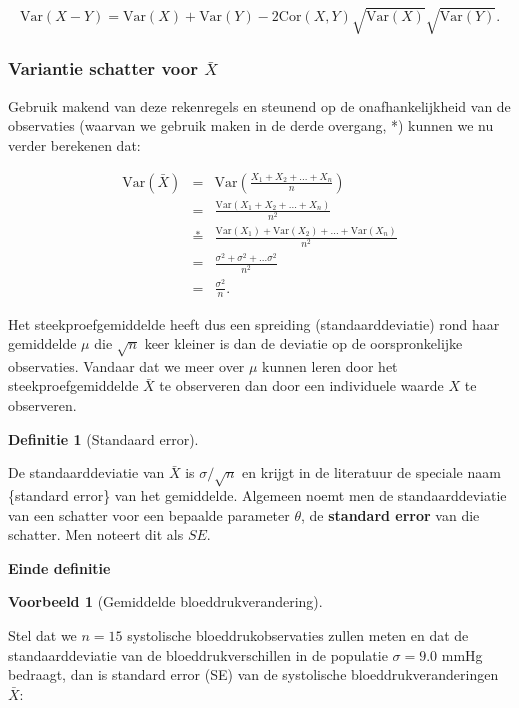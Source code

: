 \documentclass[
  12pt,dutch,coursenotes]{book}
\theoremstyle{definition}
\newtheorem{definition}{Definitie}[chapter]
\theoremstyle{definition}
\newtheorem{example}{Voorbeeld}[chapter]
\theoremstyle{definition}
\theoremstyle{remark}
\begin{document}
\begin{equation*}
\text{Var}(X-Y) = \text{Var}(X) + \text{Var}(Y) -2{\text{Cor}}(X,Y)\sqrt{\text{Var}(X)}\sqrt{\text{Var}(Y)}.
\end{equation*}

\hypertarget{variantie-schatter-voor-bar-x}{%
\subsubsection{\texorpdfstring{Variantie schatter voor \(\bar X\)}{Variantie schatter voor \textbackslash bar X}}\label{variantie-schatter-voor-bar-x}}

Gebruik makend van deze rekenregels en steunend
op de onafhankelijkheid van de observaties (waarvan we gebruik maken in de
derde overgang, *) kunnen we nu verder berekenen dat:

\begin{eqnarray*}
\text{Var}(\bar X)&=&\text{Var} \left(\frac{X_1+ X_2+ ... + X_n}{n}\right) \\
&= & \frac{\text{Var} (X_1+ X_2+ ... + X_n)}{n^2} \\
&\overset{*}{=} & \frac{\text{Var}(X_1)+ \text{Var}(X_2)+ ... + \text{Var}(X_n)}{n^2} \\
&=& \frac{\sigma^2 + \sigma^2 + ... \sigma^2}{n^2} \\
&= & \frac{\sigma^2}{n}.
\end{eqnarray*}

Het steekproefgemiddelde heeft dus een spreiding (standaarddeviatie) rond
haar gemiddelde \(\mu\) die \(\sqrt{n}\) keer kleiner is dan de deviatie op de
oorspronkelijke observaties. Vandaar dat we meer over \(\mu\) kunnen leren
door het steekproefgemiddelde \(\bar X\) te observeren dan door een
individuele waarde \(X\) te observeren.

\begin{definition}[Standaard error]
\protect\hypertarget{def:unnamed-chunk-130}{}{\label{def:unnamed-chunk-130} \iffalse (Standaard error) \fi{} }
\end{definition}
De standaarddeviatie van \(\bar{X}\) is \(\sigma/\sqrt{n}\) en krijgt in de literatuur de speciale naam \{standard error\} van
het gemiddelde. Algemeen noemt men de standaarddeviatie van een schatter
voor een bepaalde parameter \(\theta\), de \textbf{standard error} van die
schatter. Men noteert dit als \(SE\).

\textbf{Einde definitie}

\begin{example}[Gemiddelde bloeddrukverandering]
\protect\hypertarget{exm:unnamed-chunk-131}{}{\label{exm:unnamed-chunk-131} \iffalse (Gemiddelde bloeddrukverandering) \fi{} }
\end{example}
Stel dat we \(n = 15\) systolische bloeddrukobservaties zullen meten en dat de standaarddeviatie van de bloeddrukverschillen in de populatie \(\sigma = 9.0\) mmHg bedraagt, dan is standard error (SE) van de systolische bloeddrukveranderingen \(\bar X\):
\end{document}
